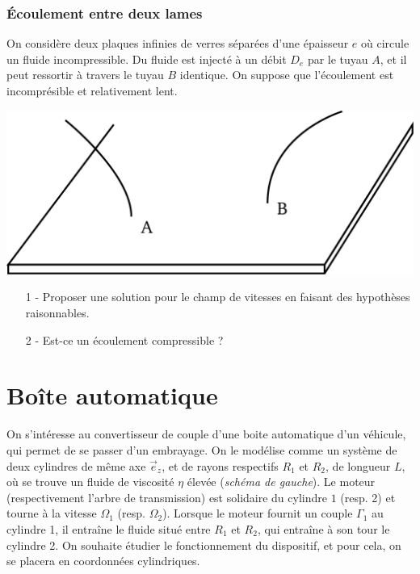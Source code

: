 \documentclass{report}
\begin{document}
\subsubsection*{Écoulement entre deux lames}

On considère deux plaques infinies de verres séparées d'une épaisseur $e$ où circule un fluide incompressible. Du fluide est injecté à un débit $D_e$ par le tuyau $A$, et il peut ressortir à travers le tuyau $B$ identique. On suppose que l'écoulement est incomprésible et relativement lent.

\begin{center}
	\includegraphics[scale=0.25]{plaque.pdf}
\end{center}

\begin{itemize}
	\item[1 - ] Proposer une solution pour le champ de vitesses en faisant des hypothèses raisonnables.
	\item[2 - ] Est-ce un écoulement compressible ?
\end{itemize}

\newpage

\section*{Boîte automatique}

On s'intéresse au convertisseur de couple d'une boite automatique d'un véhicule, qui permet de se passer d'un embrayage. On le modélise comme un système de deux cylindres de même axe $\vec{e}_z$, et de rayons respectifs $R_1$ et $R_2$, de longueur $L$, où se trouve un fluide de viscosité $\eta$ élevée (\textit{schéma de gauche}). Le moteur (respectivement l'arbre de transmission) est solidaire du cylindre $1$ (resp. 2) et tourne à la vitesse $\Omega_1$ (resp. $\Omega_2$). Lorsque le moteur fournit un couple $\Gamma_1$ au cylindre 1, il entraîne le fluide situé entre $R_1$ et $R_2$, qui entraîne à son tour le cylindre 2. On souhaite étudier le fonctionnement du dispositif, et pour cela, on se placera en coordonnées cylindriques. 
\end{document}
